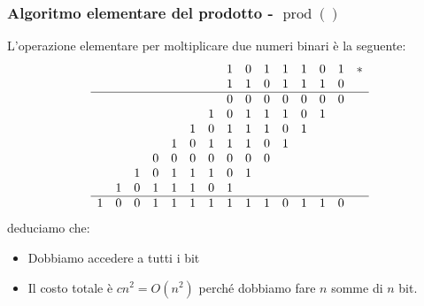         \subsubsection{Algoritmo elementare del prodotto - $\operatorname{prod}()$}
            L'operazione elementare per moltiplicare due numeri binari è la seguente:
            $$
                \begin{array}{c c c c c c c c c c c c c c c}
                    & & & & & & & 1 & 0 & 1 & 1 & 1 & 0 & 1 & *\\
                    & & & & & & & 1 & 1 & 0 & 1 & 1 & 1 & 0 & \\
                    \hline
                    & & & & & & & 0 & 0 & 0 & 0 & 0 & 0 & 0 &\\
                    & & & & & & 1 & 0 & 1 & 1 & 1 & 0 & 1 & &\\
                    & & & & & 1 & 0 & 1 & 1 & 1 & 0 & 1 & & &\\
                    & & & & 1 & 0 & 1 & 1 & 1 & 0 & 1 & & & &\\
                    & & & 0 & 0 & 0 & 0 & 0 & 0 & 0 & & & & &\\
                    & & 1 & 0 & 1 & 1 & 1 & 0 & 1 & & & & & &\\
                    & 1 & 0 & 1 & 1 & 1 & 0 & 1 & & & & & & &\\
                    \hline
                    1 & 0 & 0 & 1 & 1 & 1 & 1 & 1 & 1 & 1 & 0 & 1 & 1 & 0\\
                \end{array}
            $$
            deduciamo che:
            \begin{itemize}
                \item Dobbiamo accedere a tutti i bit
                \item Il costo totale è $ cn^2 = O(n^2) $ perché dobbiamo fare $ n $ somme di $ n $ bit.
            \end{itemize}
